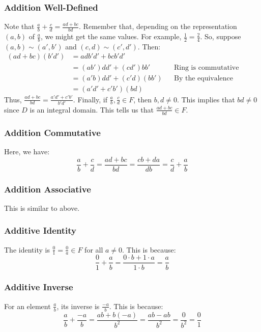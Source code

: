 \documentclass[letterpaper]{article}
\begin{document}
\subsubsection{Addition Well-Defined}
Note that $\frac{a}{b} + \frac{c}{d} = \frac{ad + bc}{bd}$. Remember that, depending on the representation $(a, b)$ of $\frac{a}{b}$, we might get the same values. For example, $\frac{1}{2} = \frac{2}{4}$. So, suppose $(a, b) \sim (a', b')$ and $(c, d) \sim (c', d')$. Then: 
\begin{equation*}
    \begin{aligned}
        (ad + bc)(b' d') &= adb'd' + bcb'd' \\ 
            &= (ab')dd' + (cd')bb' && \text{Ring is commutative} \\ 
            &= (a'b)dd' + (c'd)(bb') && \text{By the equivalence relation} \\ 
            &= (a'd' + c'b')(bd)
    \end{aligned}
\end{equation*}
Thus, $\frac{ad + bc}{bd} = \frac{a'd' + c'b'}{b'd'}$. Finally, if $\frac{a}{b}, \frac{c}{d} \in F$, then $b, d \neq 0$. This implies that $bd \neq 0$ since $D$ is an integral domain. This tells us that $\frac{ad + bc}{bd} \in F$. 

\subsubsection{Addition Commutative}
Here, we have: 
\[\frac{a}{b} + \frac{c}{d} = \frac{ad + bc}{bd} = \frac{cb + da}{db} = \frac{c}{d} + \frac{a}{b}\]

\subsubsection{Addition Associative}
This is similar to above.

\subsubsection{Additive Identity}
The identity is $\frac{0}{1} = \frac{0}{a} \in F$ for all $a \neq 0$. This is because:
\[\frac{0}{1} + \frac{a}{b} = \frac{0 \cdot b + 1 \cdot a}{1 \cdot b} = \frac{a}{b}\] 

\subsubsection{Additive Inverse}
For an element $\frac{a}{b}$, its inverse is $\frac{-a}{b}$. This is because: 
\[\frac{a}{b} + \frac{-a}{b} = \frac{ab + b(-a)}{b^2} = \frac{ab - ab}{b^2} = \frac{0}{b^2} = \frac{0}{1}\]
\end{document}
